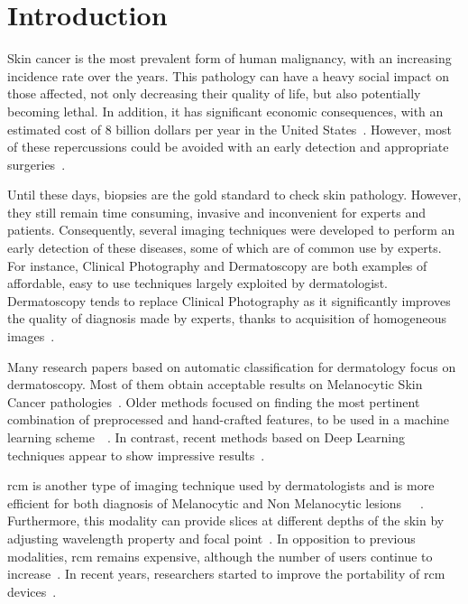 \section{Introduction}
\label{intro}
Skin cancer is the most prevalent form of human malignancy, with an increasing incidence rate over the years. This pathology can have a heavy social impact on those affected, not only decreasing their quality of life, but also potentially becoming lethal. In addition, it has significant economic consequences, with an estimated cost of 8 billion dollars per year in the United States~\cite{Farberg2017a}. However, most of these repercussions could be avoided with an early detection and appropriate surgeries~\cite{Farberg2017a}.\par
Until these days, biopsies are the gold standard to check skin pathology. However, they still remain time consuming, invasive and inconvenient for experts and patients. Consequently, several imaging techniques were developed to perform an early detection of these diseases, some of which are of common use by experts. For instance, Clinical Photography and Dermatoscopy are both examples of affordable, easy to use techniques largely exploited by dermatologist. Dermatoscopy tends to replace Clinical Photography as it significantly improves the quality of diagnosis made by experts, thanks to acquisition of homogeneous images~\cite{Sinz2017}.\par
Many research papers based on automatic classification for dermatology focus on dermatoscopy. Most of them obtain acceptable results on Melanocytic Skin Cancer pathologies~\cite{Iyatomi2010}. Older methods focused on finding the most pertinent combination of preprocessed and hand-crafted features, to be used in a machine learning scheme~\cite{Rastgoo2015}~\cite{Pathan2018}. In contrast, recent methods based on Deep Learning techniques appear to show impressive results~\cite{Esteva2017}.\par
\ac{rcm} is another type of imaging technique used by dermatologists and is more efficient for both diagnosis of Melanocytic and Non Melanocytic lesions~\cite{Gerger2006}~\cite{Guitera2009}~\cite{Haroon2017}. Furthermore, this modality can provide slices at different depths of the skin by adjusting wavelength property and focal point~\cite{Kolm2012}. In opposition to previous modalities, \ac{rcm} remains expensive, although the number of users continue to increase~\cite{Batta2015}. In recent years, researchers started to improve the portability of \ac{rcm} devices~\cite{Freeman2018}.\par 
